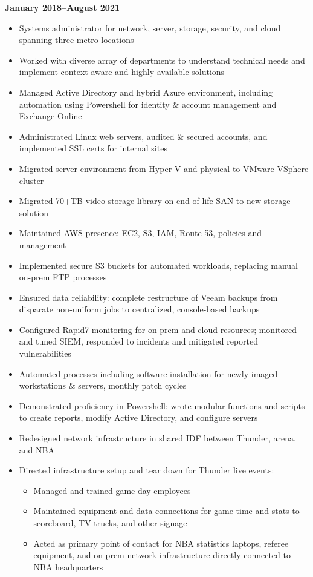 \documentclass[line]{res}
\begin{document}
\begin{resume}
\textbf{January 2018--August 2021}
	\begin{itemize}
		\item Systems administrator for network, server, storage, security, and cloud spanning three metro locations
		\item Worked with diverse array of departments to understand technical needs and implement context-aware and highly-available solutions
		\item Managed Active Directory and hybrid Azure environment, including automation using Powershell for identity \& account management and Exchange Online
		\item Administrated Linux web servers, audited \& secured accounts, and implemented SSL certs for internal sites
		\item Migrated server environment from Hyper-V and physical to VMware VSphere cluster
		\item Migrated 70+TB video storage library on end-of-life SAN to new storage solution
		\item Maintained AWS presence: EC2, S3, IAM, Route 53, policies and management
		\item Implemented secure S3 buckets for automated workloads, replacing manual on-prem FTP processes
		\item Ensured data reliability: complete restructure of Veeam backups from disparate non-uniform jobs to centralized, console-based backups
		\item Configured Rapid7 monitoring for on-prem and cloud resources; monitored and tuned SIEM, responded to incidents and mitigated reported vulnerabilities
		\item Automated processes including software installation for newly imaged workstations \& servers, monthly patch cycles
		\item Demonstrated proficiency in Powershell: wrote modular functions and scripts to create reports, modify Active Directory, and configure servers 
		\item Redesigned network infrastructure in shared IDF between Thunder, arena, and NBA
		\item Directed infrastructure setup and tear down for Thunder live events:
			\begin{itemize}
				\item Managed and trained game day employees
				\item Maintained equipment and data connections for game time and stats to scoreboard, TV trucks, and other signage
				\item Acted as primary point of contact for NBA statistics laptops, referee equipment, and on-prem network infrastructure directly connected to NBA headquarters 

\end{itemize}
\end{itemize}
\end{resume}
\end{document}
